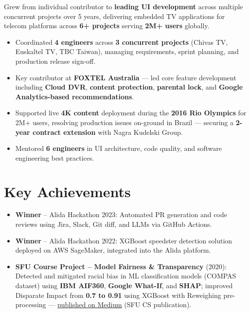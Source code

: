 \documentclass[10pt,a4paper]{article}
\begin{document}
Grew from individual contributor to \textbf{leading UI development} across multiple concurrent projects over 5 years, delivering embedded TV applications for telecom platforms across \textbf{6+ projects} serving \textbf{2M+ users} globally.

\begin{itemize}[leftmargin=1.2em, label=\textopenbullet]
  \item Coordinated \textbf{4 engineers} across \textbf{3 concurrent projects} (Chivas TV, Euskaltel TV, TBC Taiwan), managing requirements, sprint planning, and production release sign-off.
  \item Key contributor at \textbf{FOXTEL Australia} --- led core feature development including \textbf{Cloud DVR}, \textbf{content protection}, \textbf{parental lock}, and \textbf{Google Analytics-based recommendations}.
  \item Supported live \textbf{4K content} deployment during the \textbf{2016 Rio Olympics} for 2M+ users, resolving production issues on-ground in Brazil --- securing a \textbf{2-year contract extension} with Nagra Kudelski Group.
  \item Mentored \textbf{6 engineers} in UI architecture, code quality, and software engineering best practices.
\end{itemize}

\section{Key Achievements}

\begin{itemize}[leftmargin=*, itemsep=1pt, label=\textbullet]
  \item \textbf{Winner} -- Alida Hackathon 2023: Automated PR generation and code reviews using Jira, Slack, Git diff, and LLMs via GitHub Actions.
  \item \textbf{Winner} -- Alida Hackathon 2022: XGBoost speedster detection solution deployed on AWS SageMaker, integrated into the Alida platform.
  \item \textbf{SFU Course Project -- Model Fairness \& Transparency} (2020): Detected and mitigated racial bias in ML classification models (COMPAS dataset) using \textbf{IBM AIF360}, \textbf{Google What-If}, and \textbf{SHAP}; improved Disparate Impact from \textbf{0.7 to 0.91} using XGBoost with Reweighing pre-processing --- \href{https://medium.com/sfu-cspmp/model-transparency-fairness-552a747b444}{published on Medium} (SFU CS publication).
\end{itemize}
\end{document}
